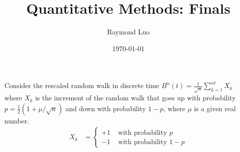 \documentclass[12pt,twoside, letter]{exam}
\theoremstyle{definition}
\begin{document}
\abovedisplayskip=12pt
\belowdisplayskip=12pt
\abovedisplayshortskip=7pt
\belowdisplayshortskip=10pt
\allowdisplaybreaks

\setlength{\parindent}{18pt}

\title{Quantitative Methods: Finals}
\author{Raymond Luo}
\date{\today}
\maketitle

 Consider the rescaled random walk in discrete time $B^n(t) = \frac{1}{\sqrt{n}}
  \sum^{nt}_{k=1} X_k$ where $X_k$ is the increment of the random walk that goes up with probability $p = \frac{1}{2}
  (1+\mu/\sqrt{n})$ and down with probability $1-p$, where $\mu$ is a given real number.
    \begin{align*}
      X_k &=
        \begin{cases}
          +1 & \text{ with probability } p \\
          -1 & \text{ with probability } 1-p
        \end{cases}
    \end{align*}
\end{document}
